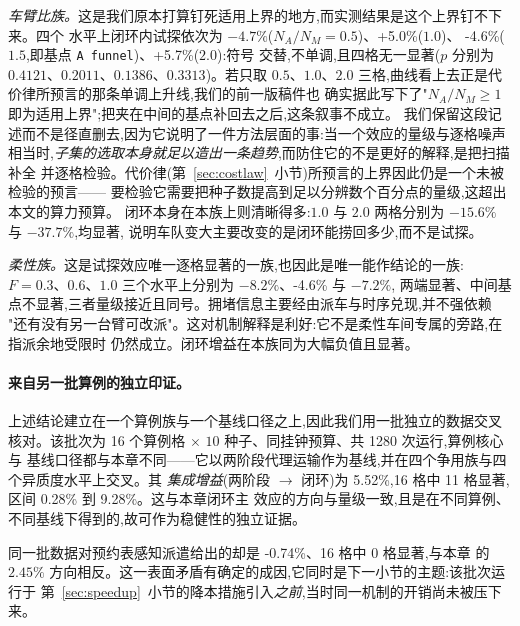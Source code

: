 \documentclass[manuscript,screen,review]{acmart}
\newcommand{\GainProbeLoop}{2.45\%}      %
\newcommand{\GainProbeStarve}{4.7\%}     %
\newcommand{\GainProbeFleetBase}{-4.6\%} %
\newcommand{\GainProbeFleetOne}{+5.0\%}  %
\newcommand{\GainProbeFleetTwo}{+5.7\%}  %
\newcommand{\MatrixCells}{16}
\newcommand{\MatrixRuns}{1280}
\newcommand{\GainIntegMatrix}{5.52\%}    %
\newcommand{\SigIntegMatrix}{11}         %
\newcommand{\GainIntegMatrixLo}{0.28\%}
\newcommand{\GainIntegMatrixHi}{9.28\%}
\newcommand{\GainProbePre}{-0.74\%}      %
\begin{document}
\emph{车臂比族。}这是我们原本打算钉死适用上界的地方,而实测结果是这个上界钉不下来。四个
水平上闭环内试探依次为 $-\GainProbeStarve$($N_A/N_M=0.5$)、\GainProbeFleetOne{}($1.0$)、
\GainProbeFleetBase{}($1.5$,即基点 \texttt{A funnel})、\GainProbeFleetTwo{}($2.0$):符号
交替,不单调,且四格无一显著($p$ 分别为 $0.4121$、$0.2011$、$0.1386$、$0.3313$)。若只取
$0.5$、$1.0$、$2.0$ 三格,曲线看上去正是代价律所预言的那条单调上升线,我们的前一版稿件也
确实据此写下了"$N_A/N_M\ge 1$ 即为适用上界";把夹在中间的基点补回去之后,这条叙事不成立。
我们保留这段记述而不是径直删去,因为它说明了一件方法层面的事:当一个效应的量级与逐格噪声
相当时,\emph{子集的选取本身就足以造出一条趋势},而防住它的不是更好的解释,是把扫描补全
并逐格检验。代价律(第~\ref{sec:costlaw}~小节)所预言的上界因此仍是一个未被检验的预言——
要检验它需要把种子数提高到足以分辨数个百分点的量级,这超出本文的算力预算。
闭环本身在本族上则清晰得多:$1.0$ 与 $2.0$ 两格分别为 $-15.6\%$ 与 $-37.7\%$,均显著,
说明车队变大主要改变的是闭环能捞回多少,而不是试探。

\emph{柔性族。}这是试探效应唯一逐格显著的一族,也因此是唯一能作结论的一族:
$F=0.3$、$0.6$、$1.0$ 三个水平上分别为 $-8.2\%$、\GainProbeFleetBase{} 与 $-7.2\%$,
两端显著、中间基点不显著,三者量级接近且同号。拥堵信息主要经由派车与时序兑现,并不强依赖
"还有没有另一台臂可改派"。这对机制解释是利好:它不是柔性车间专属的旁路,在指派余地受限时
仍然成立。闭环增益在本族同为大幅负值且显著。

\paragraph{来自另一批算例的独立印证。}
上述结论建立在一个算例族与一个基线口径之上,因此我们用一批独立的数据交叉核对。该批次为
\MatrixCells{} 个算例格 $\times$ $10$ 种子、同挂钟预算、共 \MatrixRuns{} 次运行,算例核心与
基线口径都与本章不同——它以两阶段代理运输作为基线,并在四个争用族与四个异质度水平上交叉。其
\emph{集成增益}(两阶段 $\to$ 闭环)为 \GainIntegMatrix{},\MatrixCells{} 格中
\SigIntegMatrix{} 格显著,区间 \GainIntegMatrixLo{} 到 \GainIntegMatrixHi{}。这与本章闭环主
效应的方向与量级一致,且是在不同算例、不同基线下得到的,故可作为稳健性的独立证据。

同一批数据对预约表感知派遣给出的却是 \GainProbePre{}、\MatrixCells{} 格中 $0$ 格显著,与本章
的 $\GainProbeLoop$ 方向相反。这一表面矛盾有确定的成因,它同时是下一小节的主题:该批次运行于
第~\ref{sec:speedup}~小节的降本措施引入\emph{之前},当时同一机制的开销尚未被压下来。

\end{document}
